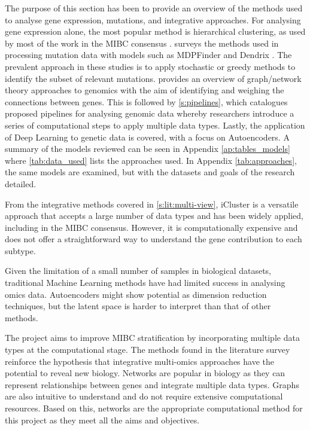 The purpose of this section has been to provide an overview of the methods used to analyse gene expression, mutations, and integrative approaches. For analysing gene expression alone, the most popular method is hierarchical clustering, as used by most of the work in the MIBC consensus \citep{Kamoun2020-tj}.  surveys the methods used in processing mutation data with models such as MDPFinder \citep{Zhao2012-wj} and Dendrix \citep{Vandin2012-cf}. The prevalent approach in these studies is to apply stochastic or greedy methods to identify the subset of relevant mutations.  provides an overview of graph/network theory approaches to genomics with the aim of identifying and weighing the connections between genes. This is followed by \cref{s:pipelines}, which catalogues proposed pipelines for analysing genomic data whereby researchers introduce a series of computational steps to apply multiple data types. Lastly, the application of Deep Learning to genetic data is covered, with a focus on Autoencoders. A summary of the models reviewed can be seen in Appendix \cref{ap:tables_models} where \cref{tab:data_used} lists the approaches used. In Appendix \cref{tab:approaches}, the same models are examined, but with the datasets and goals of the research detailed.

From the integrative methods covered in \cref{s:lit:multi-view}, iCluster \citep{Shen2012-yj} is a versatile approach that accepts a large number of data types and has been widely applied, including in the MIBC consensus. However, it is computationally expensive and does not offer a straightforward way to understand the gene contribution to each subtype.

Given the limitation of a small number of samples in biological datasets, traditional Machine Learning methods have had limited success in analysing omics data. Autoencoders might show potential as dimension reduction techniques, but the latent space is harder to interpret than that of other methods.

The project aims to improve MIBC stratification by incorporating multiple data types at the computational stage. The methods found in the literature survey reinforce the hypothesis that integrative multi-omics approaches have the potential to reveal new biology. Networks are popular in biology as they can represent relationships between genes and integrate multiple data types. Graphs are also intuitive to understand and do not require extensive computational resources. Based on this, networks are the appropriate computational method for this project as they meet all the aims and objectives.